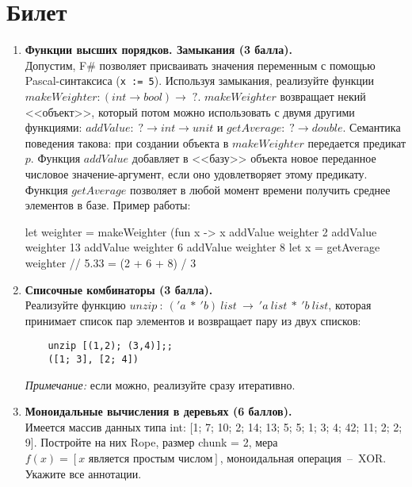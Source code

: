 \documentclass[a4paper,11pt]{article}
\renewcommand{\emph}[1]{\textit{#1}}
\newcommand{\<}{\langle}
\renewcommand{\>}{\rangle}
\begin{document}
\section*{Билет }
\begin{enumerate}
\item \textbf{Функции высших порядков. Замыкания (3 балла).}\\
  Допустим, F\# позволяет присваивать значения переменным с помощью
  Pascal-синтаксиса (\texttt{x := 5}). Используя замыкания, реализуйте
  функции $makeWeighter: (int \to bool) \to \;?$. $makeWeighter$ возвращает
  некий <<объект>>, который потом можно использовать с двумя другими
  функциями: $addValue: \;? \to int \to unit$ и $getAverage: \;? \to double$.
  Семантика поведения такова: при создании объекта в $makeWeighter$
  передается предикат $p$. Функция $addValue$ добавляет в <<базу>> объекта
  новое переданное числовое значение-аргумент, если оно удовлетворяет этому
  предикату. Функция $getAverage$ позволяет в любой момент времени получить
  среднее элементов в базе. Пример работы:
  \begin{fsharp}
    let weighter = makeWeighter (fun x -> x %
    addValue weighter 2
    addValue weighter 13
    addValue weighter 6
    addValue weighter 8
    let x = getAverage weighter // 5.33 = (2 + 6 + 8) / 3
  \end{fsharp}

\item \textbf{Списочные комбинаторы (3 балла).}\\
  Реализуйте функцию $unzip~:~('\!a~*~'\!b)~list~\rightarrow~
  '\!a~list~*~'\!b~list$, которая принимает список пар элементов и возвращает
  пару из двух списков:
  \begin{lstlisting}
    unzip [(1,2); (3,4)];;
    ([1; 3], [2; 4])
  \end{lstlisting}
  \emph{Примечание:} если можно, реализуйте сразу итеративно.

\item \textbf{Моноидальные вычисления в деревьях (6 баллов).}\\
  Имеется массив данных типа int: [1; 7; 10; 2; 14; 13; 5; 5; 1; 3;
  4; 42; 11; 2; 2; 9]. Постройте на них Rope, размер chunk = 2, мера
  $f(x) = [x\text{ является простым числом}]$, моноидальная операция~--~XOR.
  Укажите все аннотации.
\end{enumerate}
\newpage 
\end{document}
